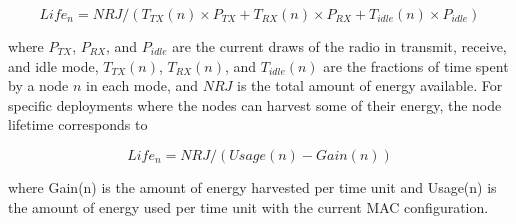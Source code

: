 \documentclass[12pt,journal,compsoc]{IEEEtran}
\begin{document}
\begin{small}
\[
Life_{n} = NRJ / (T_{TX}(n) \times P_{TX} + T_{RX}(n) \times P_{RX} + T_{idle}(n) \times P_{idle})
\]
\end{small}

where $P_{TX}$, $P_{RX}$, and $P_{idle}$ are the current draws of the radio in transmit, receive, and idle mode, $T_{TX}(n)$, $T_{RX}(n)$, and $T_{idle}(n)$ are the fractions of time spent by a node $n$ in each mode, and $NRJ$ is the total amount of energy available. For specific deployments where the nodes can harvest some of their energy, the node lifetime corresponds to \\

\begin{small}
\[
Life_{n} = NRJ / (Usage(n) - Gain(n))
\]
\end{small}

where Gain(n) is the amount of energy harvested per time unit and Usage(n) is the amount of energy used per time unit with the current MAC configuration.\\




\end{document}
